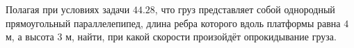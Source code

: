 Полагая при условиях задачи $44.28$, что груз представляет собой однородный
прямоугольный параллелепипед, длина ребра которого вдоль платформы равна $4$ м,
а высота $3$ м, найти, при какой скорости произойдёт опрокидывание груза.
